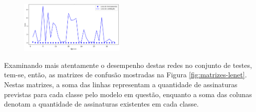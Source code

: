 \begin{figure}[H]
{	\includegraphics[width=0.45\textwidth]{imgs/lenet-adam-loss}
	}
	\label{fig:treinamento-lenet}
\end{figure}

Examinando mais atentamente o desempenho destas redes no conjunto de testes, tem-se, então, as matrizes de confusão mostradas na Figura \ref{fig:matrizes-lenet}. Nestas matrizes, a soma das linhas representam a quantidade de assinaturas previstas para cada classe pelo modelo em questão, enquanto a soma das colunas denotam a quantidade de assinaturas existentes em cada classe.

